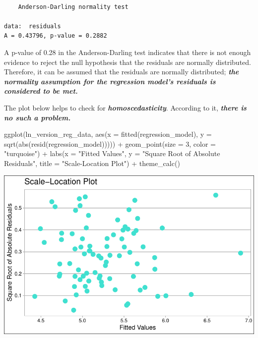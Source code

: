 \documentclass[
  11pt,
  a4paper,
  DIV=11,
  numbers=noendperiod]{scrartcl}
\newenvironment{Shaded}{\begin{snugshade}}{\end{snugshade}}
\newcommand{\AttributeTok}[1]{\textcolor[rgb]{0.40,0.45,0.13}{#1}}
\newcommand{\DecValTok}[1]{\textcolor[rgb]{0.68,0.00,0.00}{#1}}
\newcommand{\FunctionTok}[1]{\textcolor[rgb]{0.28,0.35,0.67}{#1}}
\newcommand{\NormalTok}[1]{\textcolor[rgb]{0.00,0.23,0.31}{#1}}
\newcommand{\SpecialCharTok}[1]{\textcolor[rgb]{0.37,0.37,0.37}{#1}}
\newcommand{\StringTok}[1]{\textcolor[rgb]{0.13,0.47,0.30}{#1}}
\begin{document}
\begin{verbatim}

    Anderson-Darling normality test

data:  residuals
A = 0.43796, p-value = 0.2882
\end{verbatim}

A p-value of 0.28 in the Anderson-Darling test indicates that there is
not enough evidence to reject the null hypothesis that the residuals are
normally distributed. Therefore, it can be assumed that the residuals
are normally distributed; \textbf{\emph{the normality assumption for the
regression model's residuals is considered to be met.}}

The plot below helps to check for \textbf{\emph{homoscedasticity}}.
According to it, \textbf{\emph{there is no such a problem.}}

\begin{Shaded}
\begin{Highlighting}[]
\FunctionTok{ggplot}\NormalTok{(ln\_version\_reg\_data, }\FunctionTok{aes}\NormalTok{(}\AttributeTok{x =} \FunctionTok{fitted}\NormalTok{(regression\_model), }\AttributeTok{y =} \FunctionTok{sqrt}\NormalTok{(}\FunctionTok{abs}\NormalTok{(}\FunctionTok{resid}\NormalTok{(regression\_model))))) }\SpecialCharTok{+}
  \FunctionTok{geom\_point}\NormalTok{(}\AttributeTok{size =} \DecValTok{3}\NormalTok{, }\AttributeTok{color =} \StringTok{"turquoise"}\NormalTok{)  }\SpecialCharTok{+}
  \FunctionTok{labs}\NormalTok{(}\AttributeTok{x =} \StringTok{"Fitted Values"}\NormalTok{, }\AttributeTok{y =} \StringTok{"Square Root of Absolute Residuals"}\NormalTok{, }\AttributeTok{title =} \StringTok{"Scale{-}Location Plot"}\NormalTok{) }\SpecialCharTok{+}
  \FunctionTok{theme\_calc}\NormalTok{()}
\end{Highlighting}
\end{Shaded}

\includegraphics{project_files/figure-pdf/unnamed-chunk-44-1.pdf}
\end{document}
